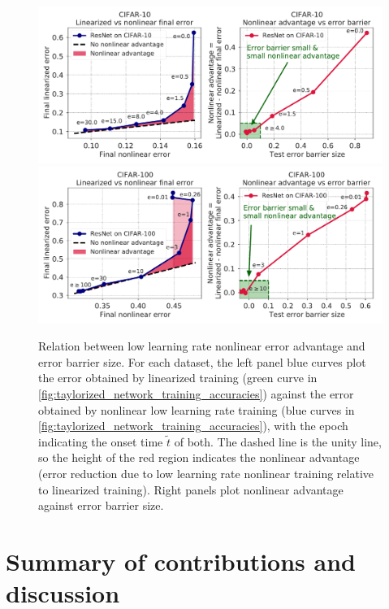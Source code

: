 \documentclass{article}
\begin{document}
\begin{figure}[h]
\centering
\includegraphics[width=0.49\linewidth]{figures/nonlinear_advantage_ResNet_CIFAR10_83881457.pdf}
\includegraphics[width=0.49\linewidth]{figures/nonlinear_advantage_ResNet_CIFAR100_83020447.pdf}
\caption{Relation between low learning rate nonlinear error advantage and error barrier size. For each dataset, the left panel blue curves plot the error obtained by linearized training (green curve in \cref{fig:taylorized_network_training_accuracies}) against the error obtained by nonlinear low learning rate training (blue curves in \cref{fig:taylorized_network_training_accuracies}), with the epoch indicating the onset time $\tilde t$ of both. The dashed line is the unity line, so the height of the red region indicates the nonlinear advantage (error reduction due to low learning rate nonlinear training relative to linearized training). Right panels plot nonlinear advantage against error barrier size.}
\label{fig:nonlinear_advantage}
\end{figure}


\vspace*{-0.3cm}
\section{Summary of contributions and discussion}
\vspace*{-0.3cm}
\label{sec:discussion}
\end{document}
